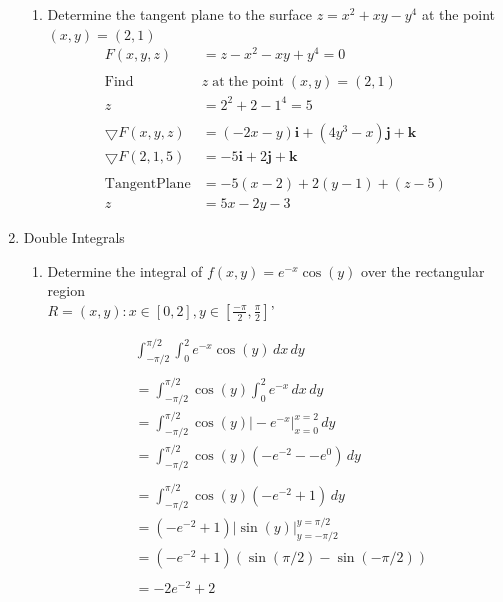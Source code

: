\documentclass[a4paper,11pt]{article}
\begin{document}
\begin{preview}
\begin{enumerate}
\begin{enumerate}
        \item Determine the tangent plane to the surface $z = x^2 + xy -y^4$ at the point $(x,y)=(2,1)$
        \begin{align*}
            F(x,y,z) &= z - x^2 - xy + y^4 = 0\\\\
            \mathrm{Find \; } &z \mathrm{\; at\; the \; point \;} (x,y) = (2,1)\\
            z &= 2^2 + 2 -1^4=5\\\\
            \bigtriangledown F(x,y,z) &= (-2x-y) \textbf{i} + (4y^3-x)\textbf{j} + \textbf{k}\\
            \bigtriangledown F(2,1,5) &= -5\textbf{i} + 2\textbf{j} + \textbf{k}\\\\
            \mathrm{Tangent Plane} &= -5(x-2) + 2(y-1) + (z-5)\\
            z &= 5x -2y -3
        \end{align*}
    
    \end{enumerate}

    \item Double Integrals
    
    \begin{enumerate}

        \item Determine the integral of $f(x,y) = e^{-x}\cos(y)$ over the rectangular region \\$R = {(x,y) : x \in [0,2], y \in [\frac{-\pi}{2}, \frac{\pi}{2}]}$'
        
        \begin{align*}
            &\int_{-\pi/2}^{\pi/2} \int_{0}^{2} e^{-x}\cos(y) \,dx \,dy\\\\
            &= \int_{-\pi/2}^{\pi/2} \cos(y) \int_{0}^{2} e^{-x} \,dx \,dy\\
            &= \int_{-\pi/2}^{\pi/2} \cos(y) \Big| -e^{-x} \Big|_{x = 0}^{x = 2} \,dy\\
            &= \int_{-\pi/2}^{\pi/2} \cos(y) (-e^{-2} - -e^0) \,dy\\\\
            &= \int_{-\pi/2}^{\pi/2} \cos(y) (-e^{-2} +1) \,dy\\
            &= (-e^{-2} +1) \Big| \sin(y) \Big|_{y = -\pi/2}^{y = \pi/2}\\
            &= (-e^{-2} +1) (\sin(\pi/2) - \sin(-\pi/2))\\\\
            &= -2e^{-2} +2\\
        \end{align*}
    

\end{enumerate}
\end{enumerate}
\end{preview}
\end{document}
